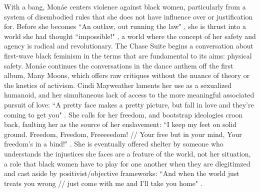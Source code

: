 \documentclass[a4paper, 11pt]{article} %
\begin{document}
With a bang, Mon\'ae centers violence against black women, particularly from a system of disembodied rules that she does not have influence over or justification for.
Before she becomes ``An outlaw, out running the law" \cite{neonvalleystreet}, she is thrust into a world she had thought ``impossible!" \cite{happyhunting}, a world where the concept of her safety and agency is radical and revolutionary.
The Chase Suite begins a conversation about first-wave black feminism in the terms that are fundamental to its aims: physical safety.
Mon\'ae continues the conversations in the dance anthem off the first album, Many Moons, which offers raw critiques without the nuance of theory or the knetics of activism.
Cindi Mayweather laments her use as a sexualized humanoid, and her simultaneous lack of access to the more meaningful associated pursuit of love: ``A pretty face makes a pretty picture, but fall in love and they're coming to get you" \cite{happyhunting}.
She calls for her freedom, and bootstrap ideologies croon back, faulting her as the source of her enslavement: ``I keep my feet on solid ground. Freedom, Freedom, Freeeeedom! // Your free but in your mind, Your freedom's in a bind!" \cite{manymoons}.
She is eventually offered shelter by someone who understands the injustices she faces are a feature of the world, not her situation, a role that black women have to play for one another when they are dlegitimzed and cast aside by positivist/objective frameworks:
``And when the world just treats you wrong // just come with me and I'll take you home" \cite{manymoons}.
\end{document}
